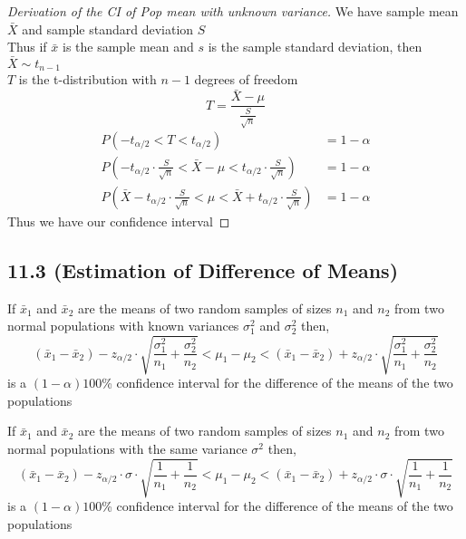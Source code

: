 \documentclass[answers,12pt,addpoints]{exam}
\begin{document}
\begin{proof}[Derivation of the CI of Pop mean with unknown variance]
    We have sample mean $\bar{X}$ and sample standard deviation $S$\\
    Thus if $\bar{x}$ is the sample mean and $s$ is the sample standard deviation, then $\bar{X} \sim t_{n-1}$\\
    $T$ is the t-distribution with $n-1$ degrees of freedom\\
    $$T = \frac{\bar{X} - \mu}{\frac{S}{\sqrt{n}}}$$
    \begin{align*}
        P(-t_{\alpha/2} < T < t_{\alpha/2}) &= 1 - \alpha\\
        P(-t_{\alpha/2} \cdot \frac{S}{\sqrt{n}} < \bar{X} - \mu < t_{\alpha/2} \cdot \frac{S}{\sqrt{n}}) &= 1 - \alpha\\
        P(\bar{X} - t_{\alpha/2} \cdot \frac{S}{\sqrt{n}} < \mu < \bar{X} + t_{\alpha/2} \cdot \frac{S}{\sqrt{n}}) &= 1 - \alpha
    \end{align*}
    Thus we have our confidence interval
\end{proof}

\subsection{11.3 (Estimation of Difference of Means)}
\begin{definition}
    If $\bar{x}_1$ and $\bar{x}_2$ are the means of two random samples of sizes $n_1$ and $n_2$ from two normal populations with known variances $\sigma_1^2$ and $\sigma_2^2$ then,
    $$(\bar{x}_1 - \bar{x}_2) - z_{\alpha/2} \cdot \sqrt{\frac{\sigma_1^2}{n_1} + \frac{\sigma_2^2}{n_2}} < \mu_1 - \mu_2< (\bar{x}_1 - \bar{x}_2) + z_{\alpha/2} \cdot \sqrt{\frac{\sigma_1^2}{n_1} + \frac{\sigma_2^2}{n_2}}$$
    is a $(1-\alpha)100$\% confidence interval for the difference of the means of the two populations
\end{definition}
\begin{definition}[CI of Difference of 2 means with $\sigma_1^2 = \sigma_2^2 = \sigma^2$ known]
    If $\bar{x}_1$ and $\bar{x}_2$ are the means of two random samples of sizes $n_1$ and $n_2$ from two normal populations with the same variance $\sigma^2$ then,
    $$(\bar{x}_1 - \bar{x}_2) - z_{\alpha/2} \cdot \sigma \cdot \sqrt{\frac{1}{n_1} + \frac{1}{n_2}} < \mu_1 - \mu_2< (\bar{x}_1 - \bar{x}_2) + z_{\alpha/2} \cdot \sigma \cdot \sqrt{\frac{1}{n_1} + \frac{1}{n_2}}$$
    is a $(1-\alpha)100$\% confidence interval for the difference of the means of the two populations
\end{definition}
\end{document}
